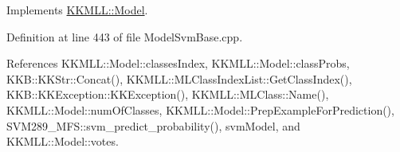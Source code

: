 Implements \hyperlink{class_k_k_m_l_l_1_1_model_ab0633c9d78133a4dafe1cf8f86a9f255}{K\+K\+M\+L\+L\+::\+Model}.



Definition at line 443 of file Model\+Svm\+Base.\+cpp.



References K\+K\+M\+L\+L\+::\+Model\+::classes\+Index, K\+K\+M\+L\+L\+::\+Model\+::class\+Probs, K\+K\+B\+::\+K\+K\+Str\+::\+Concat(), K\+K\+M\+L\+L\+::\+M\+L\+Class\+Index\+List\+::\+Get\+Class\+Index(), K\+K\+B\+::\+K\+K\+Exception\+::\+K\+K\+Exception(), K\+K\+M\+L\+L\+::\+M\+L\+Class\+::\+Name(), K\+K\+M\+L\+L\+::\+Model\+::num\+Of\+Classes, K\+K\+M\+L\+L\+::\+Model\+::\+Prep\+Example\+For\+Prediction(), S\+V\+M289\+\_\+\+M\+F\+S\+::svm\+\_\+predict\+\_\+probability(), svm\+Model, and K\+K\+M\+L\+L\+::\+Model\+::votes.


